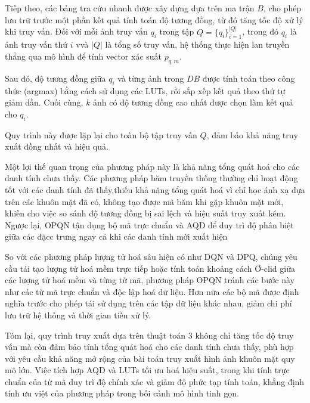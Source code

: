 Tiếp theo, các bảng tra cứu nhanh được xây dựng dựa trên ma trận $B$, cho phép lưu trữ trước một phần kết quả tính toán độ tương đồng, từ đó tăng tốc độ xử lý khi truy vấn. Đối với mỗi ảnh truy vấn $q_i$ trong tập $Q = \{q_i\}_{i=1}^{|Q|} $, trong đó $q_i$ là ảnh truy vấn thứ $i$ vvà $|Q|$ là tổng số truy vấn, hệ thống thực hiện lan truyền thẳng qua mô hình để tính vector xác suất $p_{q,m}$. 

Sau đó, độ tương đồng giữa $q_i$ và từng ảnh trong $DB$ được tính toán theo công thức (argmax) bằng cách sử dụng các LUTs, rồi sắp xếp kết quả theo thứ tự giảm dần. Cuối cùng, $k$ ảnh có độ tương đồng cao nhất được chọn làm kết quả cho $q_i$. 

Quy trình này được lặp lại cho toàn bộ tập truy vấn $Q$, đảm bảo khả năng truy xuất đồng nhất và hiệu quả.

Một lợi thế quan trọng của phương pháp này là khả năng tổng quát hoá cho các danh tính chưa thấy. Các phương pháp băm truyền thống thường chỉ hoạt động tốt với các danh tính đã thấy,thiếu khả năng tổng quát hoá vì chỉ học ánh xạ dựa trên các khuôn mặt đã có, không tạo được mã băm khi gặp khuôn mặt mới, khiến cho việc so sánh độ tương đồng bị sai lệch và hiệu suất truy xuất kém. Ngược lại, OPQN tận dụng bộ mã trực chuẩn và AQD để duy trì độ phân biệt giữa các đặcc trưng ngay cả khi các danh tính mới xuất hiện

So với các phương pháp lượng tử hoá sâu hiện có như DQN và DPQ, chúng yêu cầu tái tạo lượng tử hoá mềm trực tiếp hoặc tính toán khoảng cách Ơ-clid giữa các lượng tử hoá mềm và từng từ mã, phương pháp OPQN tránh các bước này như các từ mã trực chuẩn và độc lập hoá dữ liệu. Hơn nữa các bộ mã được định nghĩa trước cho phép tái sử dụng trên các tập dữ liệu khác nhau, giảm chi phí lưu trữ hệ thống và thời gian tiền xử lý.

Tóm lại, quy trình truy xuất dựa trên thuật toán 3 không chỉ tăng tốc độ truy vấn mà còn đảm bảo tính tổng quát hoá cho các danh tính chưa thấy, phù hợp với yêu cầu khả năng mở rộng của bài toán truy xuất hình ảnh khuôn mặt quy mô lớn. Việc tích hợp AQD và LUTs tối ưu hoá hiệu suất, trong khi tính trực chuẩn của từ mã duy trì độ chính xác và giảm độ phức tạp tính toán, khằng định tính ưu việt của phương pháp trong bối cảnh mô hình tinh gọn.
